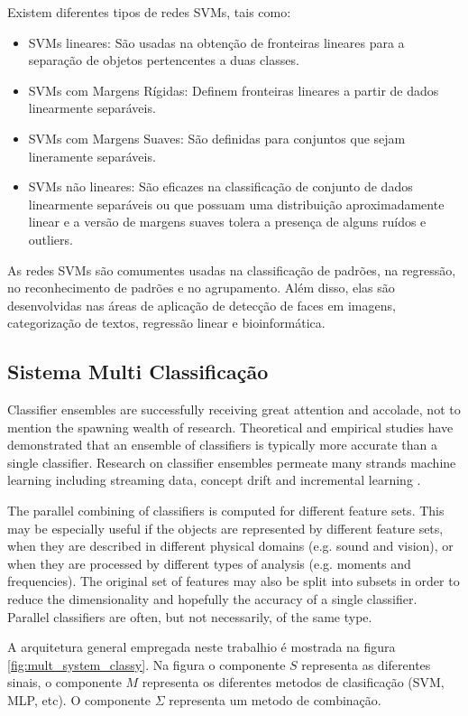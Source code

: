 \documentclass[12pt]{article}
\begin{document}
Existem diferentes tipos de redes SVMs, tais como:
\begin{itemize}
    \item SVMs lineares: São usadas na obtenção de fronteiras lineares para a separação de objetos pertencentes a duas classes.
    \item SVMs com Margens Rígidas: Definem fronteiras lineares a partir de dados linearmente separáveis.
    \item  SVMs com Margens Suaves: São definidas para conjuntos que sejam lineramente separáveis.
    \item SVMs não lineares: São eficazes na classificação de conjunto de dados linearmente separáveis ou que possuam uma distribuição aproximadamente linear e a versão de margens suaves tolera a presença de alguns ruídos e outliers.
\end{itemize}

As redes SVMs são comumentes usadas na classificação de padrões, na regressão, no reconhecimento de padrões e no agrupamento. Além disso, elas são desenvolvidas nas áreas de aplicação de detecção de faces em imagens, categorização de textos, regressão linear e bioinformática.



\subsection{Sistema Multi Classificação}

Classifier ensembles are successfully receiving great attention and accolade, not to mention the spawning wealth of research. Theoretical and empirical studies have demonstrated that an ensemble of classifiers is typically more accurate than a single classifier. Research on classifier ensembles permeate many strands machine learning including streaming data, concept drift and incremental learning \cite{elwell2011incremental}.

The parallel combining of classifiers is computed for different feature sets. This may be especially useful if the objects are represented by different feature sets, when they are described in different physical domains (e.g. sound and vision), or when they are processed by different types of analysis (e.g. moments and frequencies). The original set of features may also be split into subsets in order to reduce the dimensionality and hopefully the accuracy of a single classifier. Parallel classifiers are often, but not necessarily, of the same type.

A arquitetura general empregada neste trabalhio é mostrada na figura \ref{fig:mult_system_classy}. Na figura o componente $S$ representa as diferentes sinais, o componente $M$ representa os diferentes metodos de clasificação (SVM, MLP, etc). O componente $\Sigma$ representa um metodo de combinação.  
\end{document}

